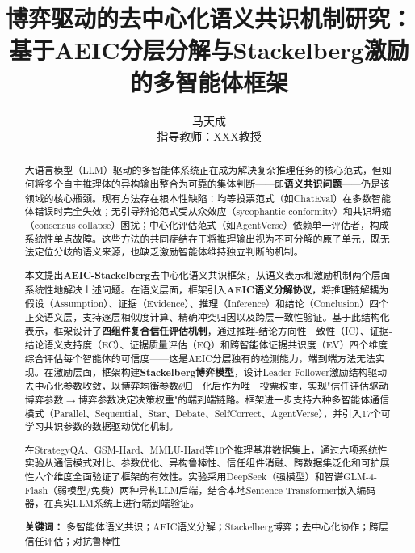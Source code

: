 \documentclass[12pt,a4paper,UTF8,fontset=fandol]{ctexart}
\title{\textbf{博弈驱动的去中心化语义共识机制研究：\\基于AEIC分层分解与Stackelberg激励的多智能体框架}}
\author{马天成 \\ 指导教师：XXX教授}
\date{}
\begin{document}
\maketitle

\begin{abstract}
大语言模型（LLM）驱动的多智能体系统正在成为解决复杂推理任务的核心范式，但如何将多个自主推理体的异构输出整合为可靠的集体判断——即\textbf{语义共识问题}——仍是该领域的核心瓶颈。现有方法存在根本性缺陷：均等投票范式（如ChatEval）在多数智能体错误时完全失效；无引导辩论范式受从众效应（sycophantic conformity）和共识坍缩（consensus collapse）困扰；中心化评估范式（如AgentVerse）依赖单一评估者，构成系统性单点故障。这些方法的共同症结在于将推理输出视为不可分解的原子单元，既无法定位分歧的语义来源，也缺乏激励智能体维持独立判断的机制。

本文提出\textbf{AEIC-Stackelberg}去中心化语义共识框架，从语义表示和激励机制两个层面系统性地解决上述问题。在语义层面，框架引入\textbf{AEIC语义分解协议}，将推理链解耦为假设（Assumption）、证据（Evidence）、推理（Inference）和结论（Conclusion）四个正交语义层，支持逐层相似度计算、精确冲突归因以及跨层一致性验证。基于此结构化表示，框架设计了\textbf{四组件复合信任评估机制}，通过推理-结论方向性一致性（IC）、证据-结论语义支持度（EC）、证据质量评估（EQ）和跨智能体证据共识度（EV）四个维度综合评估每个智能体的可信度——这是AEIC分层独有的检测能力，端到端方法无法实现。在激励层面，框架构建\textbf{Stackelberg博弈模型}，设计Leader-Follower激励结构驱动去中心化参数收敛，以博弈均衡参数$\theta$归一化后作为唯一投票权重，实现"信任评估驱动博弈参数$\to$博弈参数决定决策权重"的端到端链路。框架进一步支持六种多智能体通信模式（Parallel、Sequential、Star、Debate、SelfCorrect、AgentVerse），并引入17个可学习共识参数的数据驱动优化机制。

在StrategyQA、GSM-Hard、MMLU-Hard等10个推理基准数据集上，通过六项系统性实验从通信模式对比、参数优化、异构鲁棒性、信任组件消融、跨数据集泛化和可扩展性六个维度全面验证了框架的有效性。实验采用DeepSeek（强模型）和智谱GLM-4-Flash（弱模型/免费）两种异构LLM后端，结合本地Sentence-Transformer嵌入编码器，在真实LLM系统上进行端到端验证。

\noindent\textbf{关键词：} 多智能体语义共识；AEIC语义分解；Stackelberg博弈；去中心化协作；跨层信任评估；对抗鲁棒性
\end{abstract}

\tableofcontents
\newpage

\end{document}

